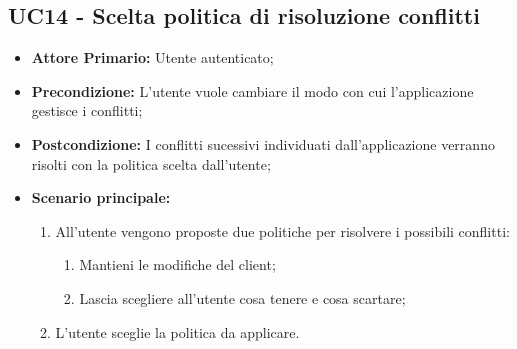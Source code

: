 \subsection{UC14 - Scelta politica di risoluzione conflitti}
\label{UC14}
\begin{itemize}
\item \textbf{Attore Primario:} Utente autenticato;
\item \textbf{Precondizione:} L'utente vuole cambiare il modo con cui l'applicazione gestisce i conflitti;
\item \textbf{Postcondizione:} I conflitti sucessivi individuati dall'applicazione verranno risolti con la politica scelta dall'utente;
\item \textbf{Scenario principale:}
    \begin{enumerate}
    \item All'utente vengono proposte due politiche per risolvere i possibili conflitti:
        \begin{enumerate}
        \item Mantieni le modifiche del client;
        \item Lascia scegliere all'utente cosa tenere e cosa scartare;
        \end{enumerate}
    \item L'utente sceglie la politica da applicare.
    \end{enumerate}
\end{itemize}
